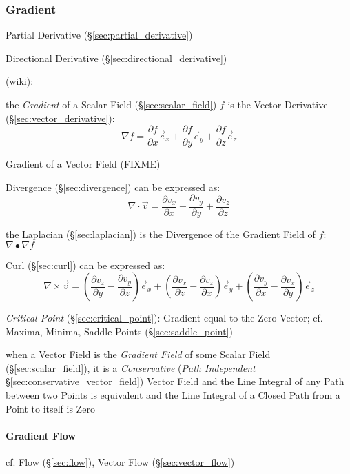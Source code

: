 \subsubsection{Gradient}\label{sec:gradient}

Partial Derivative (\S\ref{sec:partial_derivative})

Directional Derivative (\S\ref{sec:directional_derivative})

(wiki):

the \emph{Gradient} of a Scalar Field (\S\ref{sec:scalar_field}) $f$ is the
Vector Derivative (\S\ref{sec:vector_derivative}):
\[
  \nabla f =
    \frac{\partial f}{\partial x}\vec{e}_x +
    \frac{\partial f}{\partial y}\vec{e}_y +
    \frac{\partial f}{\partial z}\vec{e}_z
\]

Gradient of a Vector Field (FIXME)

Divergence (\S\ref{sec:divergence}) can be expressed as:
\[
  \nabla \cdot \vec{v} =
    \frac{\partial v_x}{\partial x} +
    \frac{\partial v_y}{\partial y} +
    \frac{\partial v_z}{\partial z}
\]

the Laplacian (\S\ref{sec:laplacian}) is the Divergence of the Gradient Field
of $f$: $\nabla \bullet \nabla f$

Curl (\S\ref{sec:curl}) can be expressed as:
\[
  \nabla\times\vec{v} =
    (\frac{\partial v_z}{\partial y}-\frac{\partial v_y}{\partial z})\vec{e}_x +
    (\frac{\partial v_x}{\partial z}-\frac{\partial v_z}{\partial x})\vec{e}_y +
    (\frac{\partial v_y}{\partial x}-\frac{\partial v_x}{\partial y})\vec{e}_z
\]

\emph{Critical Point} (\S\ref{sec:critical_point}): Gradient equal to the Zero
Vector; cf. Maxima, Minima, Saddle Points (\S\ref{sec:saddle_point})

when a Vector Field is the \emph{Gradient Field} of some Scalar Field
(\S\ref{sec:scalar_field}), it is a \emph{Conservative} (\emph{Path
  Independent} \S\ref{sec:conservative_vector_field}) Vector Field and the Line
Integral of any Path between two Points is equivalent and the Line Integral of
a Closed Path from a Point to itself is Zero



\paragraph{Gradient Flow}\label{sec:gradient_flow}\hfill

cf. Flow (\S\ref{sec:flow}), Vector Flow (\S\ref{sec:vector_flow})

